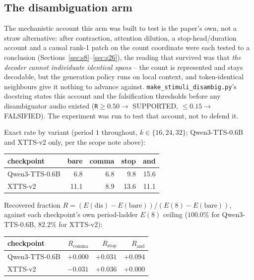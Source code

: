\documentclass[11pt]{article}
\begin{document}
\subsection{The disambiguation arm}
\label{sec:s28-dis}

The mechanistic account this arm was built to test is the paper's own, not a
straw alternative: after contraction, attention dilution, a stop-head/duration
account and a causal rank-1 patch on the count coordinate were each tested to
a conclusion (Sections~\ref{sec:s8}--\ref{sec:s26}), the reading that survived
was that \emph{the decoder cannot individuate identical spans} -- the count is
represented and stays decodable, but the generation policy runs on local
context, and token-identical neighbours give it nothing to advance against.
\texttt{make\_stimuli\_disambig.py}'s docstring states this account and the
falsification thresholds before any disambiguator audio existed
(\texttt{R}$\ge0.50\to$ SUPPORTED, $\le0.15\to$ FALSIFIED). The experiment
was run to test that account, not to defend it.

Exact rate by variant (period $1$ throughout, $k\in\{16,24,32\}$; Qwen3-TTS-0.6B
and XTTS-v2 only, per the scope note above):

\begin{center}
\begin{tabular}{@{}lrrrr@{}}
\toprule
checkpoint & bare & comma & stop & and \\
\midrule
Qwen3-TTS-0.6B  & 6.8  & 6.8  &  9.8 & 15.6 \\
XTTS-v2         & 11.1 & 8.9  & 13.6 & 11.1 \\
\bottomrule
\end{tabular}
\end{center}

\noindent Recovered fraction $R=(E(\text{dis})-E(\text{bare}))/(E(8)-E(\text{bare}))$,
against each checkpoint's own period-ladder $E(8)$ ceiling ($100.0\%$ for
Qwen3-TTS-0.6B, $82.2\%$ for XTTS-v2):

\begin{center}
\begin{tabular}{@{}lrrr@{}}
\toprule
checkpoint & $R_{\text{comma}}$ & $R_{\text{stop}}$ & $R_{\text{and}}$ \\
\midrule
Qwen3-TTS-0.6B & $+0.000$ & $+0.031$ & $+0.094$ \\
XTTS-v2        & $-0.031$ & $+0.036$ & $+0.000$ \\
\bottomrule
\end{tabular}
\end{center}
\end{document}
